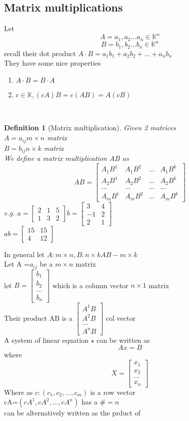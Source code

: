 \documentclass{article}
\newtheorem*{definition}{Definition}
\newcommand\m[1]{\begin{bmatrix}#1\end{bmatrix}}
\newcommand{\cd}{\cdot}
\newcommand{\as}{a_1,a_2\dots a_n}
\newcommand{\bs}{b_1,b_2\dots b_n}
\newcommand{\mn}{m \times n}
\begin{document}
\subsection{Matrix multiplications}
Let $$A=\as \in \mathbb{K}^n$$
$$B=\bs \in \mathbb{K}^n$$
recall their dot product $A \cd B=a_1b_1+a_2b_2+\dots+a_nb_n$
\\They have some nice properties
\begin{enumerate}
    \item $A\cd B=B\cd A$
    \item $c \in \mathbb{K}, (cA)B=c(AB)=A(cB)$\\
\end{enumerate}\\
\begin{definition}
    [Matrix multiplication] Given 2 matrices \\
    $A=a_{ij} \mn$ matrix\\$B=b_{ij} n\times k$ matrix\\
We define a matrix multiplication $AB$ as 
$$AB=\m{A_1B^1&A_1B^2&\dots&A_1B^k\\A_2B^1&A_2B^2&\dots&A_2B^k\\\dots &\dots &\dots &\dots\\A_mB^1&A_mB^2&\dots&A_mB^k}$$
e.g. $a=\m{2&1&5\\1&3&2} b=\m{3&4\\-1&2\\2&1}$
\\$ab=\m{15&15\\4&12}$
\end{definition}

In general let $A:\mn, B:n\times k AB-m\times k$\\
Let A =$a_{ij}$ be a $\mn$ matrix\\
let $B=\m{b_1\\b_2\\\dots \\b_n}$ which is a column vector $n\times 1$ matrix\\
Their product AB is a $\m{A^1B\\A^2B\\\dots\\A^nB}$ col vector
\\A system of linear equation $\star$ can be written as $$Ax=B$$where $$X=\m{x_1\\x_2\\\dots\\x_n}$$
Where as $c:(c_1,c_2,\dots,c_m)$ is a row vector\\
cA=$(cA^1,cA^2,\dots,cA^n)$ has a $\#=n$
\\can be alternatively written as the prduct of\\
\end{document}
